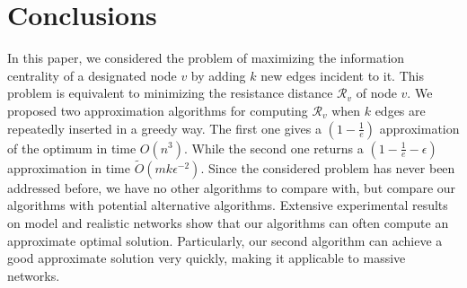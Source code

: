 \documentclass{article}
\newcommand{\eps}{\epsilon}
\newcommand\Otil{\widetilde{O}}
\begin{document}
\section{Conclusions}

In this paper, we considered the problem of maximizing the information centrality of a designated node $v$ by adding $k$ new edges incident to it. This problem is equivalent to minimizing the resistance distance $\mathcal{R}_v$ of node $v$. We proposed two approximation algorithms for computing $\mathcal{R}_v$ when $k$ edges are repeatedly inserted in a greedy way. The first one gives a $\left(1-\frac{1}{e}\right)$ approximation of the optimum in time $O(n^3)$.
While the second one returns a $\left(1-\frac{1}{e}-\eps\right)$ approximation in time $\Otil (mk\eps^{-2})$. Since the considered problem has never been addressed before, we have no other algorithms to compare with, but compare our algorithms with potential alternative algorithms. Extensive experimental results on model and realistic networks show that our algorithms can often compute an approximate optimal solution. Particularly, our second algorithm can achieve a good approximate solution very quickly, making it applicable to massive networks.
\end{document}
